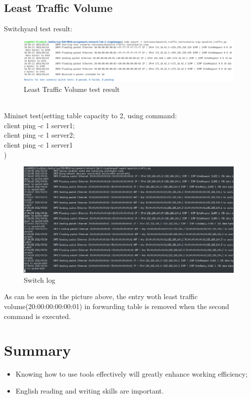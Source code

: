 \documentclass[12pt,a4paper,UTF8]{article}
\begin{document}
\subsection{Least Traffic Volume}
Switchyard test result:
\begin{figure}[htbp]
	\centering
	\includegraphics[width=\textwidth]{traffic_test}
	\caption{Least Traffic Volume test result}
\end{figure}
\\ Mininet test(setting table capacity to 2, using command: \\ client ping -c 1 server1; \\ client ping -c 1 server2; \\ client ping -c 1 server1 \\ )
\begin{figure}[htbp]
	\centering
	\includegraphics[width=\textwidth]{traffic_mininet}
	\caption{Switch log}
\end{figure}
\newpage
As can be seen in the picture above, the entry woth least traffic volume(20:00:00:00:00:01) in forwarding table is removed when the second command is executed.

\section{Summary}
\begin{itemize}
	\item Knowing how to use tools effectively will greatly enhance working efficiency;
	\item English reading and writing skills are important.
\end{itemize}
\end{document}
